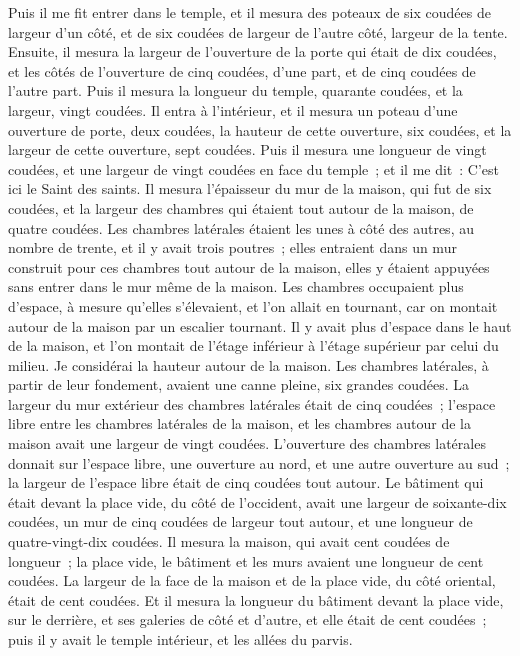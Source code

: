 \begin{multicols}{2}
\VerseOne{}Puis il me fit entrer dans le temple, et il mesura des poteaux de six coudées de largeur d'un côté, et de six coudées de largeur de l'autre côté, largeur de la tente.
Ensuite, il mesura la largeur de l'ouverture de la porte qui était de dix coudées, et les côtés de l'ouverture de cinq coudées, d'une part, et de cinq coudées de l'autre part. Puis il mesura la longueur du temple, quarante coudées, et la largeur, vingt coudées.
Il entra à l'intérieur, et il mesura un poteau d'une ouverture de porte, deux coudées, la hauteur de cette ouverture, six coudées, et la largeur de cette ouverture, sept coudées.
Puis il mesura une longueur de vingt coudées, et une largeur de vingt coudées en face du temple~; et il me dit~: C'est ici le Saint des saints.
Il mesura l'épaisseur du mur de la maison, qui fut de six coudées, et la largeur des chambres qui étaient tout autour de la maison, de quatre coudées.
Les chambres latérales étaient les unes à côté des autres, au nombre de trente, et il y avait trois poutres~; elles entraient dans un mur construit pour ces chambres tout autour de la maison, elles y étaient appuyées sans entrer dans le mur même de la maison.
Les chambres occupaient plus d'espace, à mesure qu'elles s'élevaient, et l'on allait en tournant, car on montait autour de la maison par un escalier tournant. Il y avait plus d'espace dans le haut de la maison, et l'on montait de l'étage inférieur à l'étage supérieur par celui du milieu.
Je considérai la hauteur autour de la maison. Les chambres latérales, à partir de leur fondement, avaient une canne pleine, six grandes coudées.
La largeur du mur extérieur des chambres latérales était de cinq coudées~; l'espace libre entre les chambres latérales de la maison,
et les chambres autour de la maison avait une largeur de vingt coudées.
L'ouverture des chambres latérales donnait sur l'espace libre, une ouverture au nord, et une autre ouverture au sud~; la largeur de l'espace libre était de cinq coudées tout autour.
Le bâtiment qui était devant la place vide, du côté de l'occident, avait une largeur de soixante-dix coudées, un mur de cinq coudées de largeur tout autour, et une longueur de quatre-vingt-dix coudées.
Il mesura la maison, qui avait cent coudées de longueur~; la place vide, le bâtiment et les murs avaient une longueur de cent coudées.
La largeur de la face de la maison et de la place vide, du côté oriental, était de cent coudées.
Et il mesura la longueur du bâtiment devant la place vide, sur le derrière, et ses galeries de côté et d'autre, et elle était de cent coudées~; puis il y avait le temple intérieur, et les allées du parvis.

\end{multicols}
